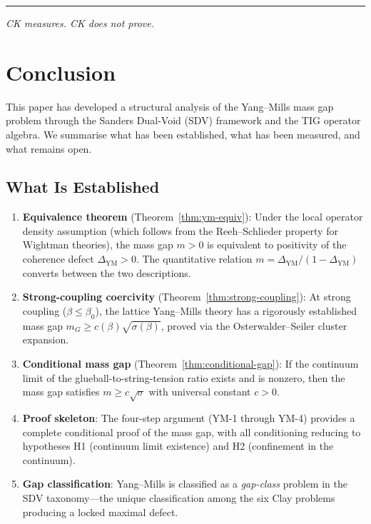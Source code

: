 \documentclass[11pt]{article}
\begin{document}
\bigskip
\hrule
\bigskip

\noindent\textit{CK measures.  CK does not prove.}

\section{Conclusion}
\label{sec:conclusion}

This paper has developed a structural analysis of the Yang--Mills mass
gap problem through the Sanders Dual-Void (SDV) framework and the TIG
operator algebra.  We summarise what has been established, what has been
measured, and what remains open.

\subsection{What Is Established}

\begin{enumerate}
  \item \textbf{Equivalence theorem} (Theorem~\ref{thm:ym-equiv}):
    Under the local operator density assumption (which follows from the
    Reeh--Schlieder property for Wightman theories), the mass gap
    $m > 0$ is equivalent to positivity of the coherence defect
    $\Delta_{\mathrm{YM}} > 0$.  The quantitative relation
    $m = \Delta_{\mathrm{YM}}/(1 - \Delta_{\mathrm{YM}})$ converts
    between the two descriptions.

  \item \textbf{Strong-coupling coercivity}
    (Theorem~\ref{thm:strong-coupling}):  At strong coupling
    ($\beta \leq \beta_0$), the lattice Yang--Mills theory has a
    rigorously established mass gap $m_G \geq c(\beta)\sqrt{\sigma(\beta)}$,
    proved via the Osterwalder--Seiler cluster expansion.

  \item \textbf{Conditional mass gap}
    (Theorem~\ref{thm:conditional-gap}):  If the continuum limit of the
    glueball-to-string-tension ratio exists and is nonzero, then the mass
    gap satisfies $m \geq c\sqrt{\sigma}$ with universal constant $c > 0$.

  \item \textbf{Proof skeleton}: The four-step argument (YM-1 through
    YM-4) provides a complete conditional proof of the mass gap, with all
    conditioning reducing to hypotheses H1 (continuum limit existence) and
    H2 (confinement in the continuum).

  \item \textbf{Gap classification}: Yang--Mills is classified as a
    \emph{gap-class} problem in the SDV taxonomy---the unique classification
    among the six Clay problems producing a locked maximal defect.
\end{enumerate}
\end{document}
